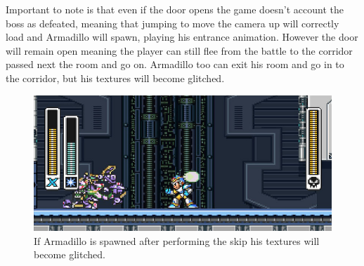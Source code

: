 Important to note is that even if the door opens the game doesn't account the boss as defeated, meaning that jumping to move the camera up will correctly load and Armadillo will spawn, playing his entrance animation. However the door will remain open meaning the player can still flee from the battle to the corridor passed next the room and go on. Armadillo too can exit his room and go in to the corridor, but his textures will become glitched.

\begin{figure}[htp]
	\centering
	\includegraphics[width=0.5\linewidth]{figures/X1/Miscs/Dillo_glitch.jpg}
	\caption{If Armadillo is spawned after performing the skip his textures will become glitched.}
\end{figure}

